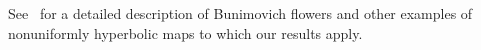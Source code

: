 \documentclass[11pt,a4paper,reqno,oneside]{amsart}
\newcommand{\eps}{\varepsilon}
\theoremstyle{definition}
\theoremstyle{remark}
\numberwithin{equation}{section}
\begin{document}
See~\cite[Section 5]{balint_komalovics} for a detailed description of Bunimovich flowers and other examples of nonuniformly hyperbolic maps to which our results apply.
%
%	
%	
\end{document}
